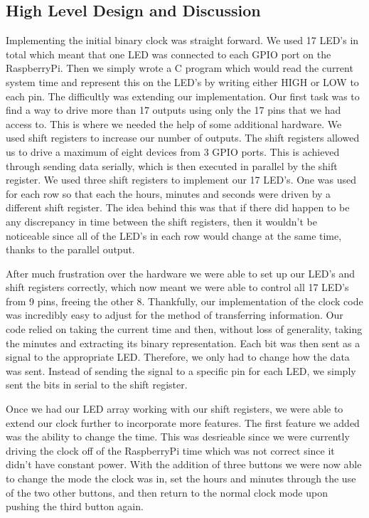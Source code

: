 \documentclass[11pt]{article}
\begin{document}
\subsection{High Level Design and Discussion}
Implementing the initial binary clock was straight forward. We used 17 LED’s in total which meant that one LED was connected to each GPIO port on the RaspberryPi. Then we simply wrote a C program which would read the current system time and represent this on the LED’s by writing either HIGH or LOW to each pin. The difficultly was extending our implementation. Our first task was to find a way to drive more than 17 outputs using only the 17 pins that we had access to. This is where we needed the help of some additional hardware. We used shift registers to increase our number of outputs. The shift registers allowed us to drive a maximum of eight devices from 3 GPIO ports. This is achieved through sending data serially, which is then executed in parallel by the shift register. We used three shift registers to implement our 17 LED’s. One was used for each row so that each the hours, minutes and seconds were driven by a different shift register. The idea behind this was that if there did happen to be any discrepancy in time between the shift registers, then it wouldn’t be noticeable since all of the LED’s in each row would change at the same time, thanks to the parallel output. \par

After much frustration over the hardware we were able to set up our LED’s and shift registers correctly, which now meant we were able to control all 17 LED’s from 9 pins, freeing the other 8. Thankfully, our implementation of the clock code was incredibly easy to adjust for the method of transferring information. Our code relied on taking the current time and then, without loss of generality, taking the minutes and extracting its binary representation. Each bit was then sent as a signal to the appropriate LED. Therefore, we only had to change how the data was sent. Instead of sending the signal to a specific pin for each LED, we simply sent the bits in serial to the shift register. \par

Once we had our LED array working with our shift registers, we were able to extend our clock further to incorporate more features. The first feature we added was the ability to change the time. This was desrieable since we were currently driving the clock off of the RaspberryPi time which was not correct since it didn't have constant power. With the addition of three buttons we were now able to change the mode the clock was in, set the hours and minutes through the use of the two other buttons, and then return to the normal clock mode upon pushing the third button again. \par
\end{document}
